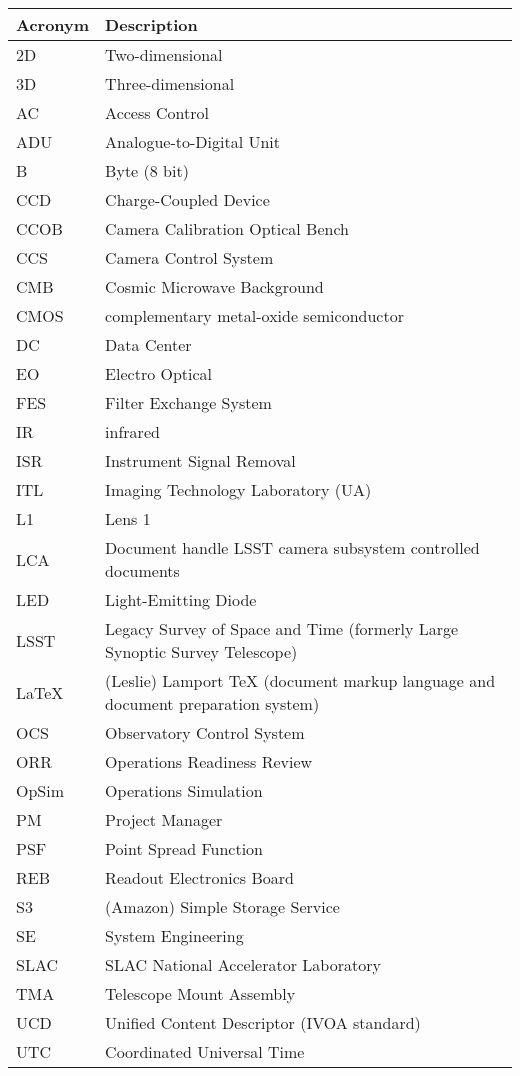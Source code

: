 \addtocounter{table}{-1}
\begin{longtable}{p{}p{}}\hline
\textbf{Acronym} & \textbf{Description}  \\\hline

2D & Two-dimensional \\\hline
3D & Three-dimensional \\\hline
AC & Access Control \\\hline
ADU & Analogue-to-Digital Unit \\\hline
B & Byte (8 bit) \\\hline
CCD & Charge-Coupled Device \\\hline
CCOB & Camera Calibration Optical Bench \\\hline
CCS & Camera Control System \\\hline
CMB & Cosmic Microwave Background \\\hline
CMOS & complementary metal-oxide semiconductor \\\hline
DC & Data Center \\\hline
EO & Electro Optical \\\hline
FES & Filter Exchange System \\\hline
IR & infrared \\\hline
ISR & Instrument Signal Removal \\\hline
ITL & Imaging Technology Laboratory (UA) \\\hline
L1 & Lens 1 \\\hline
LCA & Document handle LSST camera subsystem controlled documents \\\hline
LED & Light-Emitting Diode \\\hline
LSST & Legacy Survey of Space and Time (formerly Large Synoptic Survey Telescope) \\\hline
LaTeX & (Leslie) Lamport TeX (document markup language and document preparation system) \\\hline
OCS & Observatory Control System \\\hline
ORR & Operations Readiness Review \\\hline
OpSim & Operations Simulation \\\hline
PM & Project Manager \\\hline
PSF & Point Spread Function \\\hline
REB & Readout Electronics Board \\\hline
S3 & (Amazon) Simple Storage Service \\\hline
SE & System Engineering \\\hline
SLAC & SLAC National Accelerator Laboratory \\\hline
TMA & Telescope Mount Assembly \\\hline
UCD & Unified Content Descriptor (IVOA standard) \\\hline
UTC & Coordinated Universal Time \\\hline
\end{longtable}
